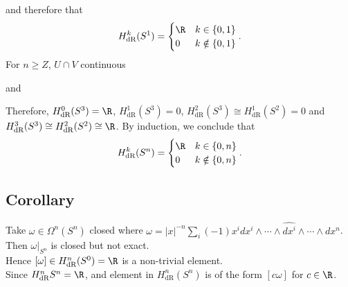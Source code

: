 \documentclass[11pt]{article}
\begin{document}
and therefore that\\
\begin{align*}
  H^{k}_{\text{dR}}(S^{1})=
  \begin{cases}
    \R & k\in\{0,1\} \\
    0 & k\notin\{0,1\}
  \end{cases}.
\end{align*}
For \(n\geq Z\), \(U\cap V\) continuous\\
and\\
Therefore, \(H^{0}_{\text{dR}}(S^{3})=\R\), \(H^{1}_{\text{dR}}(S^{3})=0\), \(H^{2}_{\text{dR}}(S^{3})\cong H^{1}_{\text{dR}}(S^{2})=0\) and \(H^{3}_{\text{dR}}(S^{3})\cong H^{2}_{\text{dR}}(S^{2})\cong\R\). By induction, we conclude that\\
\begin{align*}
  H^{k}_{\text{dR}}(S^{n})=
  \begin{cases}
    \R & k\in\{0,n\} \\
    0 & k\notin\{0,n\}
  \end{cases}.
\end{align*}
\subsection*{Corollary}
\label{sec:org5823d17}
Take \(\omega\in\Omega^{n}(S^{n})\) closed where \(\omega=|x|^{-n}\sum_{i}(-1)x^{i}dx^{i}\wedge\cdots\wedge\widehat{dx^{i}}\wedge\cdots\wedge dx^{n}\). Then \(\omega|_{S^{n}}\) is closed but not exact.\\
Hence \([\omega]\in H^{n}_{\text{dR}}(S^{0})=\R\) is a non-trivial element.\\
Since \(H^{n}_{\text{dR}}S^{n}=\R\), and element in \(H^{n}_{\text{dR}}(S^{n})\) is of the form \([c\omega]\) for \(c\in\R\).\\
\end{document}
